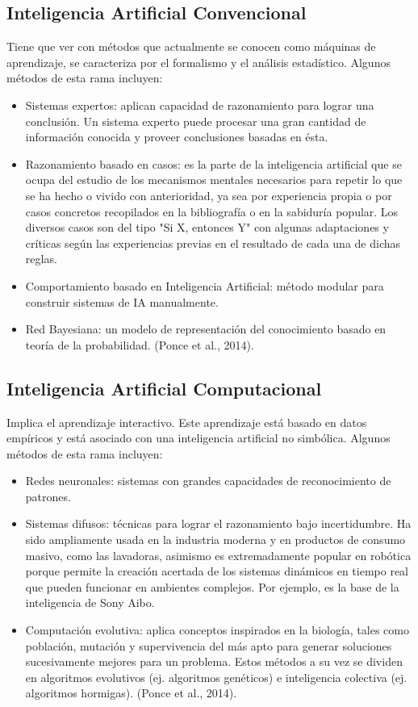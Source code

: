 \subsection{Inteligencia Artificial Convencional}
Tiene que ver con métodos que actualmente se conocen como máquinas de aprendizaje, se caracteriza por el formalismo y el análisis estadístico. Algunos métodos de esta rama incluyen:

\begin{itemize}
\item Sistemas expertos: aplican capacidad de razonamiento para lograr una conclusión. Un sistema experto puede procesar una gran cantidad de información conocida y proveer conclusiones basadas en ésta.
\item Razonamiento basado en casos: es la parte de la inteligencia artificial que se ocupa del estudio de los mecanismos mentales necesarios para repetir lo que se ha hecho o vivido con anterioridad, ya sea por experiencia propia o por casos concretos recopilados en la bibliografía o en la sabiduría popular. Los diversos casos son del tipo "Si X, entonces Y" con algunas adaptaciones y críticas según las experiencias previas en el resultado de cada una de dichas reglas.
\item Comportamiento basado en Inteligencia Artificial: método modular para construir sistemas de IA manualmente.
\item Red Bayesiana: un modelo de representación del conocimiento basado en teoría de la probabilidad. (Ponce et al., 2014).
\end{itemize}

\subsection{Inteligencia Artificial Computacional}

Implica el aprendizaje interactivo. Este aprendizaje está basado en datos empíricos y está asociado con una inteligencia artificial no simbólica. Algunos métodos de esta rama incluyen:

\begin{itemize}
\item Redes neuronales: sistemas con grandes capacidades de reconocimiento de patrones.
\item Sistemas difusos: técnicas para lograr el razonamiento bajo incertidumbre. Ha sido ampliamente usada en la industria moderna y en productos de consumo masivo, como las lavadoras, asimismo es extremadamente popular en robótica porque permite la creación acertada de los sistemas dinámicos en tiempo real que pueden funcionar en ambientes complejos. Por ejemplo, es la base de la inteligencia de Sony Aibo.
\item Computación evolutiva: aplica conceptos inspirados en la biología, tales como población, mutación y supervivencia del más apto para generar soluciones sucesivamente mejores para un problema. Estos métodos a su vez se dividen en algoritmos evolutivos (ej. algoritmos genéticos) e inteligencia colectiva (ej. algoritmos hormigas). (Ponce et al., 2014).
\end{itemize}

